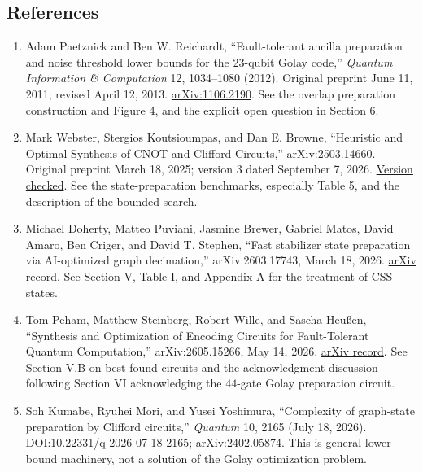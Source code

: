 \subsection*{References}

\begin{enumerate}[label={},leftmargin=4.8em,labelsep=0.5em]
  \footnotesize
  \item[\textup{[Paetznick12]}]\label{ref:c847-paetznick12}
  Adam Paetznick and Ben W. Reichardt, “Fault-tolerant ancilla preparation and noise threshold lower bounds for the 23-qubit Golay code,” \emph{Quantum Information \& Computation} 12, 1034–1080 (2012). Original preprint June 11, 2011; revised April 12, 2013. \href{https://arxiv.org/abs/1106.2190}{arXiv:1106.2190}. See the overlap preparation construction and Figure 4, and the explicit open question in Section 6.

  \item[\textup{[Webster25]}]\label{ref:c847-webster25}
  Mark Webster, Stergios Koutsioumpas, and Dan E. Browne, “Heuristic and Optimal Synthesis of CNOT and Clifford Circuits,” arXiv:2503.14660. Original preprint March 18, 2025; version 3 dated September 7, 2026. \href{https://arxiv.org/html/2503.14660v3}{Version checked}. See the state-preparation benchmarks, especially Table 5, and the description of the bounded search.

  \item[\textup{[Doherty26]}]\label{ref:c847-doherty26}
  Michael Doherty, Matteo Puviani, Jasmine Brewer, Gabriel Matos, David Amaro, Ben Criger, and David T. Stephen, “Fast stabilizer state preparation via AI-optimized graph decimation,” arXiv:2603.17743, March 18, 2026. \href{https://arxiv.org/abs/2603.17743}{arXiv record}. See Section V, Table I, and Appendix A for the treatment of CSS states.

  \item[\textup{[Peham26]}]\label{ref:c847-peham26}
  Tom Peham, Matthew Steinberg, Robert Wille, and Sascha Heußen, “Synthesis and Optimization of Encoding Circuits for Fault-Tolerant Quantum Computation,” arXiv:2605.15266, May 14, 2026. \href{https://arxiv.org/abs/2605.15266}{arXiv record}. See Section V.B on best-found circuits and the acknowledgment discussion following Section VI acknowledging the $44$-gate Golay preparation circuit.

  \item[\textup{[Kumabe26]}]\label{ref:c847-kumabe26}
  Soh Kumabe, Ryuhei Mori, and Yusei Yoshimura, “Complexity of graph-state preparation by Clifford circuits,” \emph{Quantum} 10, 2165 (July 18, 2026). \href{https://doi.org/10.22331/q-2026-07-18-2165}{DOI:10.22331/q-2026-07-18-2165}; \href{https://arxiv.org/abs/2402.05874}{arXiv:2402.05874}. This is general lower-bound machinery, not a solution of the Golay optimization problem.
\end{enumerate}

